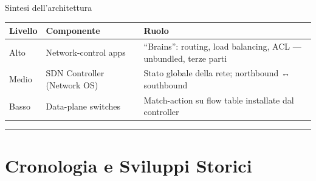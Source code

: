 \documentclass[
  italian,
  openany]{book}
\newcounter{none} %
\begin{document}
\begin{calloutnote}{Sintesi dell’architettura}

{\def\LTcaptype{none} %
\begin{longtable}[]{@{}
  >{\raggedright\arraybackslash}p{}
  >{\raggedright\arraybackslash}p{}
  >{\raggedright\arraybackslash}p{}@{}}
\toprule\noalign{}
\begin{minipage}[b]{\linewidth}\raggedright
Livello
\end{minipage} & \begin{minipage}[b]{\linewidth}\raggedright
Componente
\end{minipage} & \begin{minipage}[b]{\linewidth}\raggedright
Ruolo
\end{minipage} \\
\midrule\noalign{}
\endhead
\bottomrule\noalign{}
\endlastfoot
Alto & Network-control apps & ``Brains'': routing, load balancing, ACL
--- unbundled, terze parti \\
Medio & SDN Controller (Network OS) & Stato globale della rete;
northbound ↔ southbound \\
Basso & Data-plane switches & Match-action su flow table installate dal
controller \\
\end{longtable}
}

\end{calloutnote}

\begin{center}\rule{0.5\linewidth}{0.5pt}\end{center}

\section{Cronologia e Sviluppi
Storici}\label{cronologia-e-sviluppi-storici}
\end{document}
